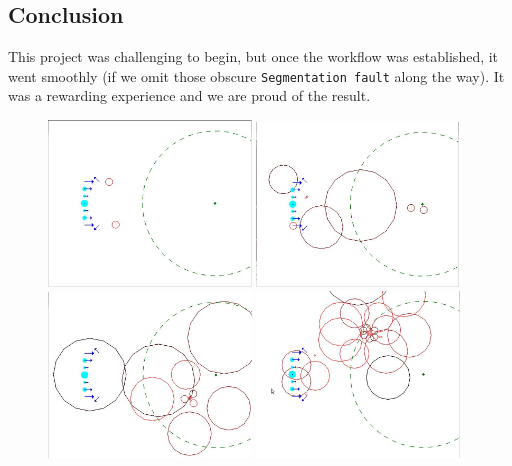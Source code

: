 \documentclass[a4paper]{article} %
\begin{document}
\begin{multicols*}{2}
\section{Conclusion}
This project was challenging to begin, but once the workflow was established, it went smoothly
(if we omit those obscure \texttt{Segmentation fault} along the way).
It was a rewarding experience and we are proud of the result.

\begin{figure}[H]
\centering
\includegraphics[width=0.48\textwidth]{1.jpg}
\includegraphics[width=0.48\textwidth]{2.jpg}
\includegraphics[width=0.48\textwidth]{3.jpg}
\includegraphics[width=0.48\textwidth]{4.jpg}

\end{figure}
\end{multicols*}
\end{document}
